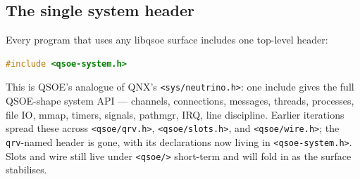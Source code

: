 \subsection{The single system header}
\label{sec:qsoe-system-h}

Every program that uses any libqsoe surface includes one top-level
header:

\begin{lstlisting}[language=C]
#include <qsoe-system.h>
\end{lstlisting}

This is QSOE's analogue of QNX's \texttt{<sys/neutrino.h>}: one
include gives the full QSOE-shape system API --- channels,
connections, messages, threads, processes, file IO, mmap, timers,
signals, pathmgr, IRQ, line discipline.  Earlier iterations spread
these across \texttt{<qsoe/qrv.h>}, \texttt{<qsoe/slots.h>}, and
\texttt{<qsoe/wire.h>}; the \texttt{qrv}-named header is gone, with
its declarations now living in \texttt{<qsoe-system.h>}.  Slots and
wire still live under \texttt{<qsoe/>} short-term and will fold in as
the surface stabilises.
